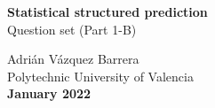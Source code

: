 \documentclass[12pt]{article}
\begin{document}
\begin{titlepage}
    \begin{center}
        \vspace*{1cm}
         \textbf{\huge Statistical structured prediction} \\        
        \vspace{0.25cm}
         {\LARGE Question set (Part 1-B)}\\
 
        \vfill
        
        

        Adrián Vázquez Barrera \\
        \vspace{0.25cm}
        Polytechnic University of Valencia\\
        \vspace{0.25cm}
        \textbf{January 2022}
             
    \end{center}
 \end{titlepage}

\newpage
\end{document}
